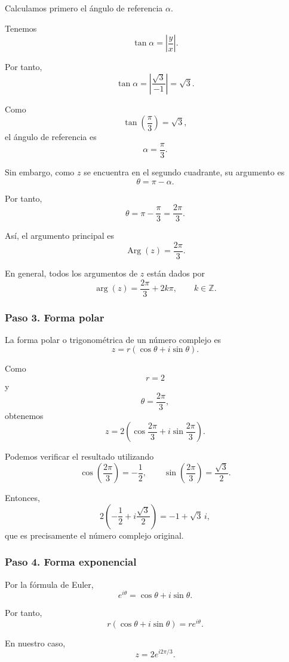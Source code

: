 \documentclass[12pt]{article}
\begin{document}
Calculamos primero el ángulo de referencia $\alpha$.

Tenemos
\[
\tan\alpha
=
\left|
\frac{y}{x}
\right|.
\]

Por tanto,
\[
\tan\alpha
=
\left|
\frac{\sqrt{3}}{-1}
\right|
=
\sqrt{3}.
\]

Como
\[
\tan\left(\frac{\pi}{3}\right)
=
\sqrt{3},
\]
el ángulo de referencia es
\[
\alpha
=
\frac{\pi}{3}.
\]

Sin embargo, como $z$ se encuentra en el segundo cuadrante,
su argumento es
\[
\theta
=
\pi-\alpha.
\]

Por tanto,
\[
\theta
=
\pi-\frac{\pi}{3}
=
\frac{2\pi}{3}.
\]

Así, el argumento principal es
\[
\boxed{
\operatorname{Arg}(z)
=
\frac{2\pi}{3}
}.
\]

En general, todos los argumentos de $z$ están dados por
\[
\boxed{
\arg(z)
=
\frac{2\pi}{3}+2k\pi,
\qquad
k\in\mathbb{Z}
}.
\]

\subsubsection*{Paso 3. Forma polar}

La forma polar o trigonométrica de un número complejo es
\[
z
=
r(\cos\theta+i\sin\theta).
\]

Como
\[
r=2
\]
y
\[
\theta=\frac{2\pi}{3},
\]
obtenemos
\[
\boxed{
z
=
2\left(
\cos\frac{2\pi}{3}
+
i\sin\frac{2\pi}{3}
\right)
}.
\]

Podemos verificar el resultado utilizando
\[
\cos\left(\frac{2\pi}{3}\right)
=
-\frac{1}{2},
\qquad
\sin\left(\frac{2\pi}{3}\right)
=
\frac{\sqrt{3}}{2}.
\]

Entonces,
\[
2\left(
-\frac{1}{2}
+
i\frac{\sqrt{3}}{2}
\right)
=
-1+\sqrt{3}\,i,
\]
que es precisamente el número complejo original.

\subsubsection*{Paso 4. Forma exponencial}

Por la fórmula de Euler,
\[
e^{i\theta}
=
\cos\theta+i\sin\theta.
\]

Por tanto,
\[
r(\cos\theta+i\sin\theta)
=
re^{i\theta}.
\]

En nuestro caso,
\[
\boxed{
z
=
2e^{i2\pi/3}
}.
\]

\end{document}
